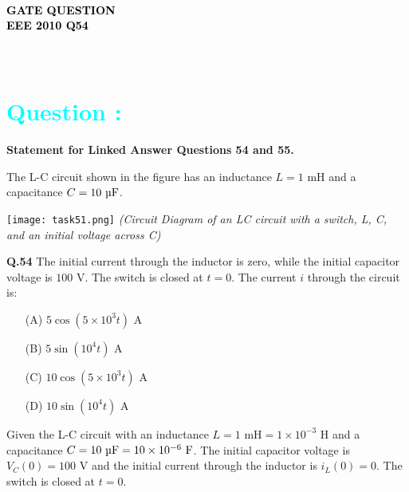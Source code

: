 \documentclass[a4paper,12pt]{article}
\begin{document}
\thispagestyle{fancy}
\fancyhf{} 
\renewcommand{\headrulewidth}{0pt} 

\vspace{1cm}
\begin{center}
    {\LARGE \textbf{\textcolor{black}{\\  GATE QUESTION \\ EEE 2010 Q54}}}
\end{center}
\vspace{-1cm}
\section*{\textcolor{cyan}{ \\Question :}}

\textbf{Statement for Linked Answer Questions 54 and 55.}

The L-C circuit shown in the figure has an inductance $L = 1 \text{ mH}$ and a capacitance $C = 10 \text{ \textmu F}$.

\begin{center}
\texttt{[image: task51.png]}
    \textit{(Circuit Diagram of an LC circuit with a switch, L, C, and an initial voltage across C)}
\end{center}
\textbf{Q.54} The initial current through the inductor is zero, while the initial capacitor voltage is $100 \text{ V}$. The switch is closed at $t = 0$. The current $i$ through the circuit is:

\begin{enumerate}
    \item[(A)] $5\cos(5\times10^3 t)\text{ A}$
    \item[(B)] $5\sin(10^4 t)\text{ A}$
    \item[(C)] $10\cos(5\times10^3 t)\text{ A}$
    \item[(D)] $10\sin(10^4 t)\text{ A}$
\end{enumerate}
Given the L-C circuit with an inductance $L = 1 \text{ mH} = 1 \times 10^{-3} \text{ H}$ and a capacitance $C = 10 \text{ \text{\text{\textnormal{\textmu}}F}} = 10 \times 10^{-6} \text{ F}$.
The initial capacitor voltage is $V_C(0) = 100 \text{ V}$ and the initial current through the inductor is $i_L(0) = 0$.
The switch is closed at $t = 0$.
\end{document}
